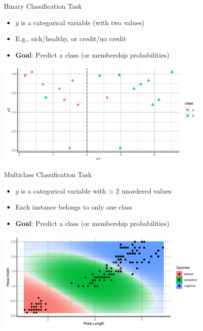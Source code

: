 \begin{frame}{Binary Classification Task}

\begin{itemize}
\item
  \(y\) is a categorical variable (with two values)
\item
  E.g., sick/healthy, or credit/no credit
\item
  \textbf{Goal}: Predict a class (or membership probabilities)
\end{itemize}

\scriptsize
\begin{center}
\includegraphics[width=0.8\textwidth]{plots/binary-class.png}
\end{center}


\normalsize 

\end{frame}

\begin{frame}{Multiclass Classification Task}

\begin{itemize}
\item
  \(y\) is a categorical variable with \textgreater{} 2 unordered values
\item
  Each instance belongs to only one class
\item
  \textbf{Goal}: Predict a class (or membership probabilities)
\end{itemize}

\scriptsize

\begin{center}
\includegraphics[width=0.8\textwidth]{plots/multi-class.png}
\end{center}

\normalsize 

\end{frame}

